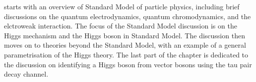 








 starts with an overview of Standard Model of particle physics, including brief discussions on the quantum electrodynamics, quantum chromodynamics, and the elctroweak interaction. The focus of the Standard Model discussion is on the  Higgs mechanism and the Higgs boson in Standard Model. The discussion then moves on to theories beyond the Standard Model, with an example of   a general parametrisation of the Higgs theory. The last part of the chapter is dedicated to the discussion on identifying a Higgs boson from vector bosons using the tau pair decay channel.


